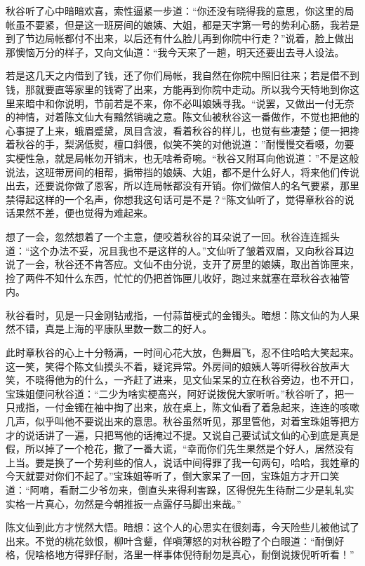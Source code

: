 \documentclass[12pt,UTF8]{ctexbook}
\begin{document}
{{{秋谷听了心中暗暗欢喜，索性逼紧一步道：“你还没有晓得我的意思，你这里的局帐虽不要紧，但是这一班房间的娘姨、大姐，都是天字第一号的势利心肠，我若是到了节边局帐都付不出来，以后还有什么脸儿再到你院中行走？”说着，脸上做出那懊恼万分的样子，又向文仙道：“我今天来了一趟，明天还要出去寻人设法。

若是这几天之内借到了钱，还了你们局帐，我自然在你院中照旧往来；若是借不到钱，那就要直等家里的钱寄了出来，方能再到你院中走动。所以我今天特地到你这里来暗中和你说明，节前若是不来，你不必叫娘姨寻我。“说罢，又做出一付无奈的神情，对着陈文仙大有黯然销魂之意。陈文仙被秋谷这一番做作，不觉也把他的心事提了上来，蛾眉蹙黛，凤目含波，看着秋谷的样儿，也觉有些凄楚；便一把搀着秋谷的手，梨涡低熨，檀口斜偎，似笑不笑的对他说道：”耐慢慢交看嗫，勿要实梗性急，就是局帐勿开销末，也无啥希奇啘。“秋谷又附耳向他说道：”不是这般说法，这班带房间的相帮，掮带挡的娘姨、大姐，都不是什么好人，将来他们传说出去，还要说你做了恩客，所以连局帐都没有开销。你们做倌人的名气要紧，那里禁得起这样的一个名声，你想我这句话可是不是？“陈文仙听了，觉得章秋谷的说话果然不差，便也觉得为难起来。

想了一会，忽然想着了一个主意，便咬着秋谷的耳朵说了一回。秋谷连连摇头道：“这个办法不妥，况且我也不是这样的人。”文仙听了皱着双眉，又向秋谷耳边说了一会，秋谷还不肯答应。文仙不由分说，支开了房里的娘姨，取出首饰匣来，捡了两件不知什么东西，忙忙的仍把首饰匣儿收好，跑过来就塞在章秋谷衣袖管内。

秋谷看时，见是一只金刚钻戒指，一付蒜苗梗式的金镯头。暗想：陈文仙的为人果然不错，真是上海的平康队里数一数二的好人。

此时章秋谷的心上十分畅满，一时间心花大放，色舞眉飞，忍不住哈哈大笑起来。这一笑，笑得个陈文仙摸头不着，疑诧异常。外房间的娘姨人等听得秋谷放声大笑，不晓得他为的什么，一齐赶了进来，见文仙呆呆的立在秋谷旁边，也不开口，宝珠姐便问秋谷道：“二少为啥实梗高兴，阿好说拨倪大家听听。”秋谷听了，把一只戒指，一付金镯在袖中掏了出来，放在桌上，陈文仙看了着急起来，连连的咳嗽几声，似乎叫他不要说出来的意思。秋谷虽然听见，那里管他，对着宝珠姐等把方才的说话讲了一遍，只把骂他的话掩过不提。又说自己要试试文仙的心到底是真是假，所以掉了一个枪花，撒了一番大谎，“幸而你们先生果然是个好人，居然没有上当。要是换了一个势利些的倌人，说话中间得罪了我一句两句，哈哈，我姓章的今天就要对你们不起了。”宝珠姐等听了，倒大家呆了一回，宝珠姐方才开口笑道：“阿唷，看耐二少爷勿来，倒直头来得利害跺，区得倪先生待耐二少是轧轧实实格一片真心，勿然是今朝推扳一点露仔马脚出来哉。”

陈文仙到此方才恍然大悟。暗想：这个人的心思实在很刻毒，今天险些儿被他试了出来。不觉的桃花敛恨，柳叶含颦，佯嗔薄怒的对秋谷瞪了个白眼道：“耐倒好格，倪啥格地方得罪仔耐，洛里一样事体倪待耐勿是真心，耐倒说拨倪听听看！”

}}}
\end{document}
